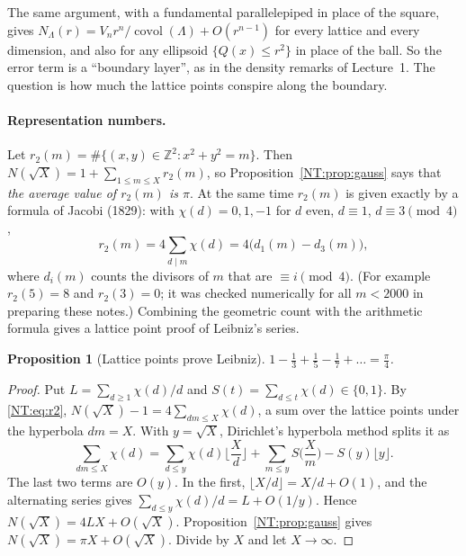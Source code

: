 \documentclass[11pt,openany]{book}
\theoremstyle{plain}
\newtheorem{proposition}[theorem]{Proposition}
\theoremstyle{definition}
\theoremstyle{remark}
\newcommand{\Z}{\mathbb{Z}}
\newcommand{\Lat}{\Lambda}             %
\newcommand{\covol}{\operatorname{covol}}
\begin{document}
The same argument, with a fundamental parallelepiped in place of the square, gives
$N_\Lat(r)=V_nr^n/\covol(\Lat)+O(r^{n-1})$ for every lattice and every dimension, and also for any
ellipsoid $\{Q(x)\le r^2\}$ in place of the ball. So the error term is a ``boundary layer'', as in the
density remarks of Lecture~1. The question is how much the lattice points conspire along the boundary.

\paragraph{Representation numbers.} Let $r_2(m)=\#\{(x,y)\in\Z^2:x^2+y^2=m\}$. Then
$N(\sqrt X)=1+\sum_{1\le m\le X}r_2(m)$, so Proposition~\ref{NT:prop:gauss} says that \emph{the average
value of $r_2(m)$ is $\pi$}. At the same time $r_2(m)$ is given exactly by a formula of Jacobi (1829):
with $\chi(d)=0,1,-1$ for $d$ even, $d\equiv1$, $d\equiv3\pmod4$,
\begin{equation}\label{NT:eq:r2}
  r_2(m)=4\sum_{d\mid m}\chi(d)=4\big(d_1(m)-d_3(m)\big),
\end{equation}
where $d_i(m)$ counts the divisors of $m$ that are $\equiv i\pmod 4$. (For example $r_2(5)=8$ and
$r_2(3)=0$; it was checked numerically for all $m<2000$ in preparing these notes.) Combining the
geometric count with the arithmetic formula gives a lattice point proof of Leibniz's series.

\begin{proposition}[Lattice points prove Leibniz]\label{NT:prop:leibniz}
$1-\frac13+\frac15-\frac17+\dots=\frac\pi4$.
\end{proposition}

\begin{proof}
Put $L=\sum_{d\ge1}\chi(d)/d$ and $S(t)=\sum_{d\le t}\chi(d)\in\{0,1\}$. By \eqref{NT:eq:r2},
$N(\sqrt X)-1=4\sum_{dm\le X}\chi(d)$, a sum over the lattice points under the hyperbola $dm=X$. With
$y=\sqrt X$, Dirichlet's hyperbola method splits it as
\[
  \sum_{dm\le X}\chi(d)=\sum_{d\le y}\chi(d)\Big\lfloor\frac Xd\Big\rfloor+\sum_{m\le y}S\Big(\frac Xm\Big)-S(y)\lfloor y\rfloor .
\]
The last two terms are $O(y)$. In the first, $\lfloor X/d\rfloor=X/d+O(1)$, and the alternating series
gives $\sum_{d\le y}\chi(d)/d=L+O(1/y)$. Hence $N(\sqrt X)=4LX+O(\sqrt X)$. Proposition~\ref{NT:prop:gauss}
gives $N(\sqrt X)=\pi X+O(\sqrt X)$. Divide by $X$ and let $X\to\infty$.
\end{proof}
\end{document}
